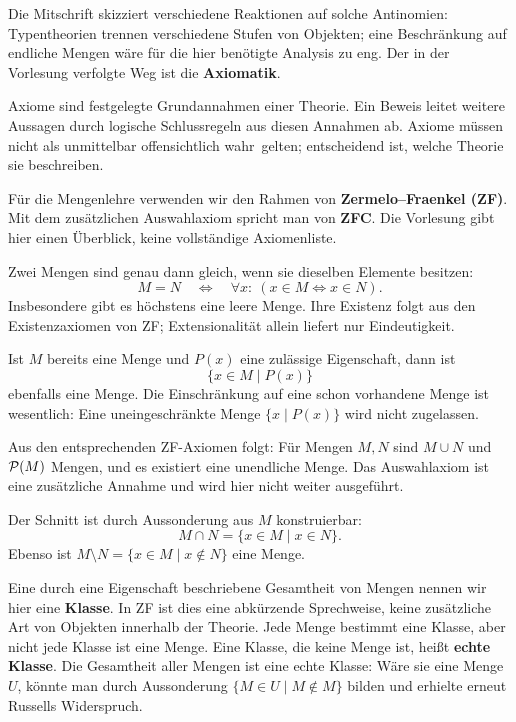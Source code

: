 Die Mitschrift skizziert verschiedene Reaktionen auf solche Antinomien:
Typentheorien trennen verschiedene Stufen von Objekten; eine Beschränkung
auf endliche Mengen wäre für die hier benötigte Analysis zu eng.
Der in der Vorlesung verfolgte Weg ist die \textbf{Axiomatik}.

\begin{definition}
Axiome sind festgelegte Grundannahmen einer Theorie. Ein Beweis leitet
weitere Aussagen durch logische Schlussregeln aus diesen Annahmen ab.
Axiome müssen nicht als unmittelbar \glqq offensichtlich wahr\grqq\ gelten;
entscheidend ist, welche Theorie sie beschreiben.
\end{definition}

Für die Mengenlehre verwenden wir den Rahmen von
\textbf{Zermelo--Fraenkel (ZF)}. Mit dem zusätzlichen Auswahlaxiom spricht
man von \textbf{ZFC}. Die Vorlesung gibt hier einen Überblick, keine
vollständige Axiomenliste.

\begin{description}[style=nextline,leftmargin=0pt]
\item[Extensionalitätsaxiom]
Zwei Mengen sind genau dann gleich, wenn sie dieselben Elemente besitzen:
\[
    M=N\quad\Longleftrightarrow\quad
    \forall x:\ (x\in M\Longleftrightarrow x\in N).
\]
Insbesondere gibt es höchstens eine leere Menge. Ihre Existenz folgt aus
den Existenzaxiomen von ZF; Extensionalität allein liefert nur Eindeutigkeit.
\item[Aussonderungsschema]
Ist $M$ bereits eine Menge und $P(x)$ eine zulässige Eigenschaft, dann ist
\[
    \{x\in M\mid P(x)\}
\]
ebenfalls eine Menge. Die Einschränkung auf eine schon vorhandene Menge
ist wesentlich: Eine uneingeschränkte Menge $\{x\mid P(x)\}$ wird nicht
zugelassen.
\item[Weitere Existenzforderungen]
Aus den entsprechenden ZF-Axiomen folgt: Für Mengen $M,N$ sind $M\cup N$
und $\mathcal{P}(M)$ Mengen, und es existiert eine unendliche Menge.
Das Auswahlaxiom ist eine zusätzliche Annahme und wird hier nicht
weiter ausgeführt.
\end{description}

\begin{beispiel}
Der Schnitt ist durch Aussonderung aus $M$ konstruierbar:
\[
    M\cap N=\{x\in M\mid x\in N\}.
\]
Ebenso ist $M\setminus N=\{x\in M\mid x\notin N\}$ eine Menge.
\end{beispiel}

\begin{bemerkung}
Eine durch eine Eigenschaft beschriebene Gesamtheit von Mengen nennen wir
hier eine \textbf{Klasse}. In ZF ist dies eine abkürzende Sprechweise,
keine zusätzliche Art von Objekten innerhalb der Theorie.
Jede Menge bestimmt eine Klasse, aber nicht jede Klasse ist eine Menge.
Eine Klasse, die keine Menge ist, heißt \textbf{echte Klasse}.
Die Gesamtheit aller Mengen ist eine echte Klasse: Wäre sie eine Menge
$U$, könnte man durch Aussonderung
$\{M\in U\mid M\notin M\}$ bilden und erhielte erneut Russells Widerspruch.
\end{bemerkung}


